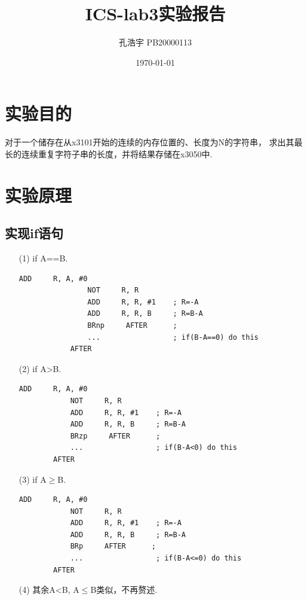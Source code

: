 \documentclass[UTF8]{ctexart}
\title{ICS-lab3实验报告}
\author{孔浩宇 PB20000113}
\date{\today}
\begin{document}
\fancyfoot[C]{\thepage}

\maketitle
\tableofcontents
\newpage

\section{实验目的}
    对于一个储存在从x3101开始的连续的内存位置的、长度为N的字符串，
    求出其最长的连续重复字符子串的长度，并将结果存储在x3050中.

\section{实验原理}
    \subsection{实现if语句}
    \begin{enumerate}
        \item [(1)]if A==B.
        \begin{lstlisting}[basicstyle=\ttfamily,language={[x86masm]Assembler}]
                ADD     R, A, #0
                NOT     R, R
                ADD     R, R, #1    ; R=-A
                ADD     R, R, B     ; R=B-A
                BRnp     AFTER      ;
                ...                 ; if(B-A==0) do this
            AFTER                   
        \end{lstlisting}

        \item [(2)]if A>B.
        \begin{lstlisting}[basicstyle=\ttfamily,language={[x86masm]Assembler}]
            ADD     R, A, #0
            NOT     R, R
            ADD     R, R, #1    ; R=-A
            ADD     R, R, B     ; R=B-A
            BRzp     AFTER      ;
            ...                 ; if(B-A<0) do this
        AFTER                   
        \end{lstlisting}

        \item [(3)]if A$\geq$B.
        \begin{lstlisting}[basicstyle=\ttfamily,language={[x86masm]Assembler}]
            ADD     R, A, #0
            NOT     R, R
            ADD     R, R, #1    ; R=-A
            ADD     R, R, B     ; R=B-A
            BRp     AFTER      ;
            ...                 ; if(B-A<=0) do this
        AFTER                   
        \end{lstlisting}

        \item [(4)]其余A<B, A$\leq$B类似，不再赘述.
    \end{enumerate}
\end{document}
